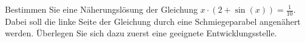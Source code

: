 \item Bestimmen Sie eine Näherungslösung der Gleichung $x\cdot(2+\sin(x))=\frac{1}{10}$. Dabei soll die linke Seite der Gleichung durch eine Schmiegeparabel angenähert werden. Überlegen Sie sich dazu zuerst eine geeignete Entwicklungsstelle.
